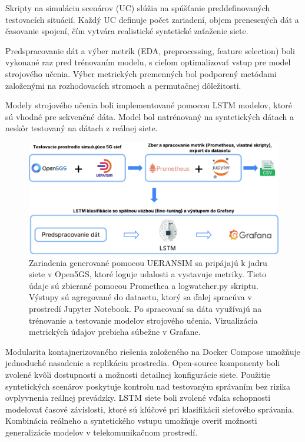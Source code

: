 Skripty na simuláciu scenárov (UC) slúžia na spúšťanie preddefinovaných testovacích situácií. Každý UC definuje počet zariadení, objem prenesených dát a časovanie spojení, čím vytvára realistické syntetické zaťaženie siete.

Predspracovanie dát a výber metrík (EDA, preprocessing, feature selection) boli vykonané raz pred trénovaním modelu, s cieľom optimalizovať vstup pre model strojového učenia. Výber metrických premenných bol podporený metódami založenými na rozhodovacích stromoch a permutačnej dôležitosti.

Modely strojového učenia boli implementované pomocou LSTM modelov, ktoré sú vhodné pre sekvenčné dáta. Model bol natrénovaný na syntetických dátach a neskôr testovaný na dátach z reálnej siete.

\begin{figure}[H]
    \centering
    \includegraphics[width=0.95\linewidth]{assets//images/arch2.png}
    \caption[Architektúra systému: simulácia 5G siete, zber metrických dát a real-time klasifikácia s výstupom do Grafany.]{Zariadenia generované pomocou UERANSIM sa pripájajú k jadru siete v Open5GS, ktoré loguje udalosti a vystavuje metriky. Tieto údaje sú zbierané pomocou Promethea a logwatcher.py skriptu. Výstupy sú agregované do datasetu, ktorý sa ďalej spracúva v prostredí Jupyter Notebook. Po spracovaní sa dáta využívajú na trénovanie a testovanie modelov strojového učenia. Vizualizácia metrických údajov prebieha súbežne v Grafane.}
    \label{fig:arch}
\end{figure}

Modularita kontajnerizovaného riešenia založeného na Docker Compose umožňuje jednoduché nasadenie a replikáciu prostredia. Open-source komponenty boli zvolené kvôli dostupnosti a možnosti detailnej konfigurácie siete. Použitie syntetických scenárov poskytuje kontrolu nad testovaným správaním bez rizika ovplyvnenia reálnej prevádzky. LSTM siete boli zvolené vďaka schopnosti modelovať časové závislosti, ktoré sú kľúčové pri klasifikácii sieťového správania. Kombinácia reálneho a syntetického vstupu umožňuje overiť možnosti generalizácie modelov v telekomunikačnom prostredí.